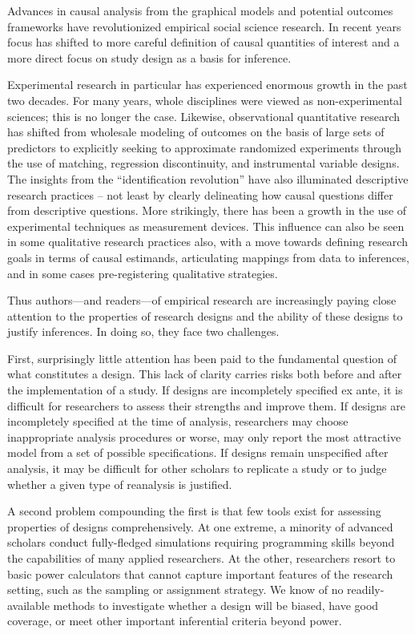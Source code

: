 \documentclass[11pt]{article}
\begin{document}
Advances in causal analysis from the graphical models and potential outcomes frameworks have revolutionized empirical social science research. In recent years focus has shifted to more careful definition of causal quantities of interest and a more direct focus on study design as a basis for inference.

Experimental research in particular has experienced enormous growth in the past two decades. For many years, whole disciplines were viewed as non-experimental sciences; this is no longer the case. Likewise, observational quantitative research has shifted from wholesale modeling of outcomes on the basis of large sets of predictors to explicitly seeking to approximate randomized experiments through the use of matching, regression discontinuity, and instrumental variable designs. The insights from the ``identification revolution'' have also illuminated descriptive research practices -- not least by clearly delineating how causal questions differ from descriptive questions. More strikingly, there has been a growth in the use of experimental techniques as measurement devices. This influence can also be seen in some qualitative research practices also, with a move towards defining research goals in terms of causal estimands, articulating mappings from data to inferences, and in some cases pre-registering qualitative strategies. 

Thus authors---and readers---of empirical research are increasingly paying close attention to the properties of research designs and the ability of these designs to justify inferences. In doing so, they face two challenges.  

First, surprisingly little attention has been paid to the fundamental question of what constitutes a design. This lack of clarity carries risks both before and after the implementation of a study. If designs are incompletely specified ex ante, it is difficult for researchers to assess their strengths and improve them. If designs are incompletely specified at the time of analysis, researchers may choose inappropriate analysis procedures or worse, may only report the most attractive model from a set of possible specifications. If designs remain unspecified after analysis, it may be difficult for other scholars to replicate a study or to judge whether a given type of reanalysis is justified. 

A second problem compounding the first is that few tools exist for assessing properties of designs comprehensively. At one extreme, a minority of advanced scholars conduct fully-fledged simulations requiring programming skills beyond the capabilities of many applied researchers. At the other, researchers resort to basic power calculators that cannot capture important features of the research setting, such as the sampling or assignment strategy. We know of no readily-available methods to investigate whether a design will be biased, have good coverage, or meet other important inferential criteria beyond power. 
\end{document}
